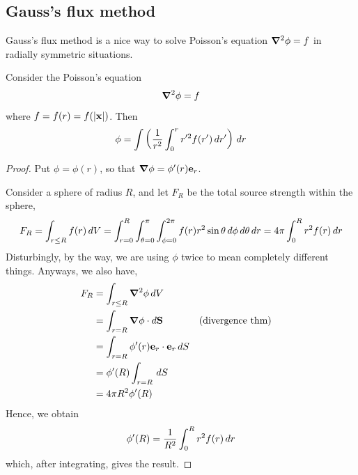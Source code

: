 \documentclass{../template/note}
\begin{document}
    \subsection{Gauss's flux method}

    Gauss's flux method is a nice way to solve Poisson's equation \(\grad^2\phi = f\) in radially symmetric situations.
    
    \begin{theorem}
        Consider the Poisson's equation
        \begin{align*}
            \grad^2 \phi = f
        \end{align*}
        where \(f = f(r) = f(|\V x|)\). Then
        \begin{align*}
            \phi = \int \left(\frac 1{r^2} \int_0^r r'^2 f(r') \,d{r}'\right) \,d{r}
        \end{align*}
    \end{theorem}
    
    \begin{proof}
        Put \(\phi = \phi(r)\), so that \(\grad \phi = \phi'(r)\V e_r\).
        
        Consider a sphere of radius \(R\), and let \(F_R\) be the total source strength within the sphere,
        \begin{align*}
            F_R = \int_{r \leq R} f(r) \,d{V} = \int_{r=0}^R \int_{\theta=0}^{\pi} \int_{\phi=0}^{2\pi} f(r) r^2 \sin \theta \,d{\phi} \,d{\theta} \,d{r} = 4\pi \int_0^R r^2 f(r) \,d{r}
        \end{align*}
        Disturbingly, by the way, we are using \(\phi\) twice to mean completely different things. Anyways, we also have,
        \begin{align*}
            F_R &= \int_{r \leq R} \grad^2 \phi \D V \\
            &= \int_{r = R} \grad \phi \cdot d\V S && \text{(divergence thm)} \\
            &= \int_{r = R} \phi'(r) \V e_r \cdot \V e_r \D S \\
            &= \phi'(R) \int_{r=R}\D S \\
            &= 4\pi R^2 \phi'(R)
        \end{align*}
        Hence, we obtain
        \begin{align*}
            \phi'(R) = \frac 1{R^2} \int_0^R r^2f(r) \,d{r}
        \end{align*}
        which, after integrating, gives the result.        
    \end{proof}
    
\end{document}
